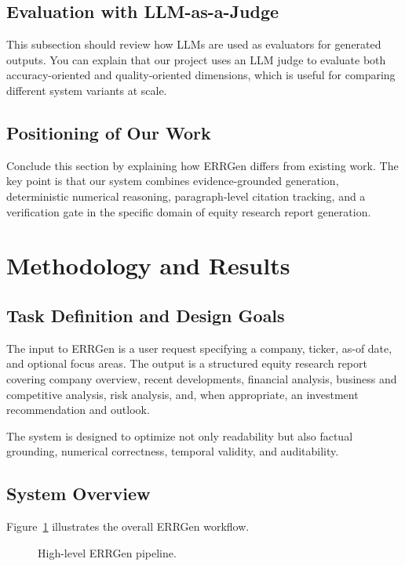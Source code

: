 \documentclass[11pt,a4paper]{article}
\begin{document}
\subsection{Evaluation with LLM-as-a-Judge}
This subsection should review how LLMs are used as evaluators for generated
outputs. You can explain that our project uses an LLM judge to evaluate both
accuracy-oriented and quality-oriented dimensions, which is useful for comparing
different system variants at scale.

\subsection{Positioning of Our Work}
Conclude this section by explaining how ERRGen differs from existing work. The
key point is that our system combines evidence-grounded generation,
deterministic numerical reasoning, paragraph-level citation tracking, and a
verification gate in the specific domain of equity research report generation.

\section{Methodology and Results}

\subsection{Task Definition and Design Goals}
The input to ERRGen is a user request specifying a company, ticker, as-of date,
and optional focus areas. The output is a structured equity research report
covering company overview, recent developments, financial analysis, business
and competitive analysis, risk analysis, and, when appropriate, an investment
recommendation and outlook.

The system is designed to optimize not only readability but also factual
grounding, numerical correctness, temporal validity, and auditability.

\subsection{System Overview}
Figure~\ref{fig:pipeline} illustrates the overall ERRGen workflow.

\begin{figure}[H]
\centering
{}
\caption{High-level ERRGen pipeline.}
\label{fig:pipeline}
\end{figure}
\end{document}

